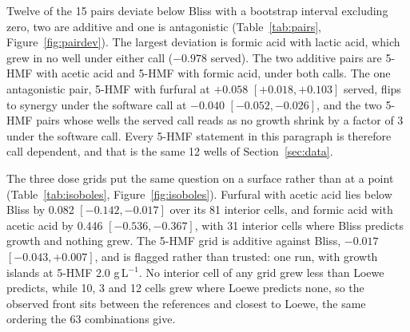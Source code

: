  Twelve of the 15 pairs deviate below Bliss with a bootstrap interval
excluding zero, two are additive and one is antagonistic
(Table~\ref{tab:pairs}, Figure~\ref{fig:pairdev}). The largest deviation is formic acid
with lactic acid, which grew in no well under either call ($-0.978$ served). The two
additive pairs are 5-HMF with acetic acid and 5-HMF with formic acid, under both calls.
The one antagonistic pair, 5-HMF with furfural at $+0.058$ $[+0.018, +0.103]$ served,
flips to synergy under the software call at $-0.040$ $[-0.052, -0.026]$, and the two
5-HMF pairs whose wells the served call reads as no growth shrink by a factor of 3 under
the software call. Every 5-HMF statement in this paragraph is therefore call dependent,
and that is the same 12 wells of Section~\ref{sec:data}.

\begin{table}[htbp]
\centering
\scriptsize
\caption[]{The 15 pairs against Bliss independence from the observed ex23 singles, ordered
by the served deviation. Observed is the mean of three wells with a well that did not grow
counted as 0. The interval is 95 percent from 2000 resamples of the replicate wells of the
pair and of both singles, and is shown for the served call; the call is synergy when the
interval lies below zero, antagonism when above, additive otherwise. The software
deviations carry their own intervals in .}
\label{tab:pairs}

\end{table}


 The three dose grids put the same question on a surface rather
than at a point (Table~\ref{tab:isoboles}, Figure~\ref{fig:isoboles}). Furfural with
acetic acid lies below Bliss by 0.082 $[-0.142, -0.017]$ over its 81 interior cells, and
formic acid with acetic acid by 0.446 $[-0.536, -0.367]$, with 31 interior cells where
Bliss predicts growth and nothing grew. The 5-HMF grid is additive against Bliss,
$-0.017$ $[-0.043, +0.007]$, and is flagged rather than trusted: one run, with growth
islands at 5-HMF 2.0 g\,L$^{-1}$. No interior cell of any grid grew less than Loewe
predicts, while 10, 3 and 12 cells grew where Loewe predicts none, so the observed front
sits between the references and closest to Loewe, the same ordering the 63 combinations
give.


